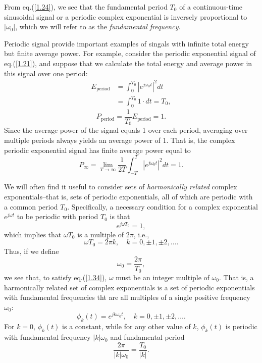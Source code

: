 \documentclass[a4paper,twoside]{book}
\begin{document}
From eq.\;(\ref{1.24}), we see that the fundamental period $T_0$ of a continuous-time sinusoidal signal or a periodic complex exponential is inversely proportional to $|\omega_0|$, which we will refer to as the \textit{fundamental frequency}.

Periodic signal provide important examples of singals with infinite total energy but finite average power. For example, consider the periodic exponential signal of eq.\;(\ref{1.21}), and suppose that we calculate the total energy and average power in this signal over one period:
\begin{equation}
    \begin{aligned}E_{\mathrm{period}}&=\int_{0}^{T_{0}}\left|e^{j\omega_{0}t}\right|^{2}dt\\&=\int_{0}^{T_{0}}1\cdot dt = T_{0},\end{aligned}
    \label{1.30}
\end{equation}
\begin{equation}
    P_{\mathrm{period}}=\dfrac1{T_0}E_{\mathrm{period}}=1.
    \label{1.31}
\end{equation}
Since the average power of the signal equals 1 over each period, averaging over multiple periods always yields an average power of 1. That is, the complex periodic exponential signal has finite average power equal to
\begin{equation}
    P_{\infty} = \lim_{T\to\infty}\frac{1}{2T}\int_{-T}^{T}\left|e^{j\omega_{0}t}\right|^{2}dt = 1.
    \label{1.32}
\end{equation}

We will often find it useful to consider sets of \textit{harmonically related} complex exponentials--that is, sets of periodic exponentials, all of which are periodic with a common period $T_0$. Specifically, a necessary condition for a complex exponential $e^{j\omega t}$ to be periodic with period $T_0$ is that
\begin{equation}
    e^{j\omega T_0}=1,
    \label{1.33}
\end{equation}
which implies that $\omega T_0$ is a multiple of $2\pi$, i.e.,
\begin{equation}
    \omega T_{0} = 2\pi k,\quad k = 0,\pm1,\pm2,\ldots.
    \label{1.34}
\end{equation}
Thus, if we define
\begin{equation}
    \omega_0=\dfrac{2\pi}{T_0},
    \label{1.35}
\end{equation}
we see that, to satisfy eq.\;(\ref{1.34}), $\omega$ must be an integer multiple of $\omega_0$. That is, a harmonically related set of complex exponentials is a set of periodic exponentials with fundamental frequencies tht are all multiples of a single positive frequency $\omega_0$:
\begin{equation}
    \phi_{k}(t)=e^{jk\omega_{0}t},\quad k=0,\pm1,\pm2,\ldots.
    \label{1.36}
\end{equation}
For $k=0$, $\phi_k(t)$ is a constant, while for any other value of $k$, $\phi_k(t)$ is periodic with fundamental frequency $|k|\omega_0$ and fundamental period
\begin{equation}
    \dfrac{2\pi}{|k|\omega_0}=\dfrac{T_0}{|k|}.
    \label{1.37}
\end{equation}
\end{document}
